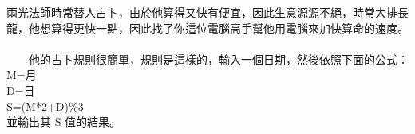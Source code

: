 兩光法師時常替人占卜，由於他算得又快有便宜，因此生意源源不絕，時常大排長龍，他想算得更快一點，因此找了你這位電腦高手幫他用電腦來加快算命的速度。\\
\\
　　他的占卜規則很簡單，規則是這樣的，輸入一個日期，然後依照下面的公式：\\
M=月\\
D=日\\
S=(M*2+D)\%3\\
並輸出其 S 值的結果。